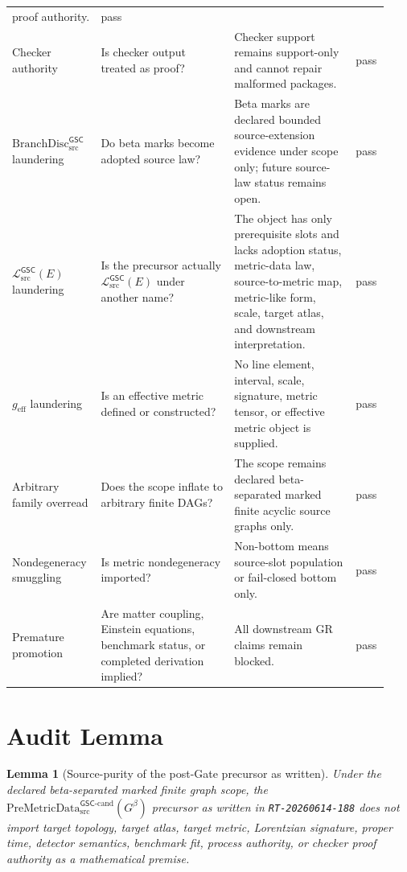 \documentclass[11pt]{article}
\newcommand{\PreMetricData}{\mathrm{PreMetricData}_{\mathrm{src}}^{\mathsf{GSC}\mbox{-}\mathrm{cand}}}
\newcommand{\MetricData}{\mathcal{L}_{\mathrm{src}}^{\mathsf{GSC}}}
\newcommand{\BranchDisc}{\mathrm{BranchDisc}_{\mathrm{src}}^{\mathsf{GSC}}}
\newcommand{\Gbeta}{G^\beta}
\newcommand{\geff}{g_{\mathrm{eff}}}
\newtheorem{lemma}{Lemma}
\begin{document}
\begin{longtable}{p{0.20\linewidth}p{0.34\linewidth}p{0.31\linewidth}p{0.08\linewidth}}
proof authority. &
pass \\
Checker authority & Is checker output treated as proof? &
Checker support remains support-only and cannot repair malformed packages. &
pass \\
\(\BranchDisc\) laundering & Do beta marks become adopted source law? &
Beta marks are declared bounded source-extension evidence under scope only;
future source-law status remains open. &
pass \\
\(\MetricData(E)\) laundering & Is the precursor actually \(\MetricData(E)\)
under another name? &
The object has only prerequisite slots and lacks adoption status, metric-data
law, source-to-metric map, metric-like form, scale, target atlas, and
downstream interpretation. &
pass \\
\(\geff\) laundering & Is an effective metric defined or constructed? &
No line element, interval, scale, signature, metric tensor, or effective metric
object is supplied. &
pass \\
Arbitrary family overread & Does the scope inflate to arbitrary finite DAGs? &
The scope remains declared beta-separated marked finite acyclic source graphs
only. &
pass \\
Nondegeneracy smuggling & Is metric nondegeneracy imported? &
Non-bottom means source-slot population or fail-closed bottom only. &
pass \\
Premature promotion & Are matter coupling, Einstein equations, benchmark
status, or completed derivation implied? &
All downstream GR claims remain blocked. &
pass \\
\bottomrule
\end{longtable}

\section{Audit Lemma}

\begin{lemma}[Source-purity of the post-Gate precursor as written]
Under the declared beta-separated marked finite graph scope, the
\(\PreMetricData(\Gbeta)\) precursor as written in \texttt{RT-20260614-188}
does not import target topology, target atlas, target metric, Lorentzian
signature, proper time, detector semantics, benchmark fit, process authority,
or checker proof authority as a mathematical premise.
\end{lemma}
\end{document}
